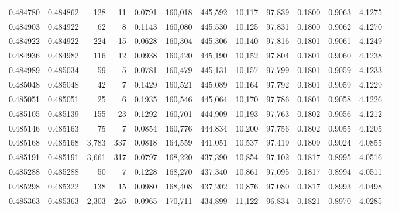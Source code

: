 \begin{tabular}{rrrrrrrrrrrrr}
0.484780 & 0.484862 &   128 &    11 &                                     0.0791 & 160,018 & 445,592 &  10,117 &  97,839 & 0.1800 & 0.9063 & 4.1275 \\
0.484903 & 0.484922 &    62 &     8 &                                     0.1143 & 160,080 & 445,530 &  10,125 &  97,831 & 0.1800 & 0.9062 & 4.1270 \\
0.484922 & 0.484922 &   224 &    15 &                                     0.0628 & 160,304 & 445,306 &  10,140 &  97,816 & 0.1801 & 0.9061 & 4.1249 \\
0.484936 & 0.484982 &   116 &    12 &                                     0.0938 & 160,420 & 445,190 &  10,152 &  97,804 & 0.1801 & 0.9060 & 4.1238 \\
0.484989 & 0.485034 &    59 &     5 &                                     0.0781 & 160,479 & 445,131 &  10,157 &  97,799 & 0.1801 & 0.9059 & 4.1233 \\
0.485048 & 0.485048 &    42 &     7 &                                     0.1429 & 160,521 & 445,089 &  10,164 &  97,792 & 0.1801 & 0.9059 & 4.1229 \\
0.485051 & 0.485051 &    25 &     6 &                                     0.1935 & 160,546 & 445,064 &  10,170 &  97,786 & 0.1801 & 0.9058 & 4.1226 \\
0.485105 & 0.485139 &   155 &    23 &                                     0.1292 & 160,701 & 444,909 &  10,193 &  97,763 & 0.1802 & 0.9056 & 4.1212 \\
0.485146 & 0.485163 &    75 &     7 &                                     0.0854 & 160,776 & 444,834 &  10,200 &  97,756 & 0.1802 & 0.9055 & 4.1205 \\
0.485168 & 0.485168 & 3,783 &   337 &                                     0.0818 & 164,559 & 441,051 &  10,537 &  97,419 & 0.1809 & 0.9024 & 4.0855 \\
0.485191 & 0.485191 & 3,661 &   317 &                                     0.0797 & 168,220 & 437,390 &  10,854 &  97,102 & 0.1817 & 0.8995 & 4.0516 \\
0.485288 & 0.485288 &    50 &     7 &                                     0.1228 & 168,270 & 437,340 &  10,861 &  97,095 & 0.1817 & 0.8994 & 4.0511 \\
0.485298 & 0.485322 &   138 &    15 &                                     0.0980 & 168,408 & 437,202 &  10,876 &  97,080 & 0.1817 & 0.8993 & 4.0498 \\
0.485363 & 0.485363 & 2,303 &   246 &                                     0.0965 & 170,711 & 434,899 &  11,122 &  96,834 & 0.1821 & 0.8970 & 4.0285 \\

\end{tabular}

